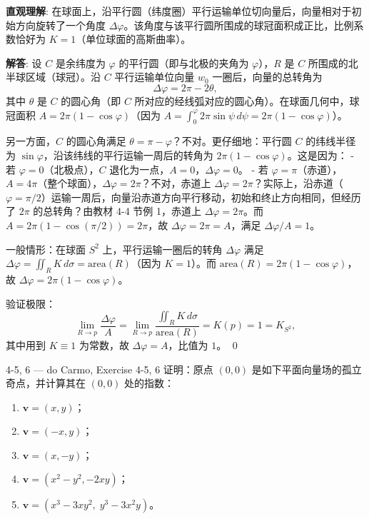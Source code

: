 \begin{solution}
\textbf{直观理解}: 在球面上，沿平行圆（纬度圈）平行运输单位切向量后，向量相对于初始方向旋转了一个角度 $\Delta\varphi$。该角度与该平行圆所围成的球冠面积成正比，比例系数恰好为 $K=1$（单位球面的高斯曲率）。

\textbf{解答}: 设 $C$ 是余纬度为 $\varphi$ 的平行圆（即与北极的夹角为 $\varphi$），$R$ 是 $C$ 所围成的北半球区域（球冠）。沿 $C$ 平行运输单位向量 $w_0$ 一圈后，向量的总转角为
\[
\Delta\varphi = 2\pi - 2\theta,
\]
其中 $\theta$ 是 $C$ 的圆心角（即 $C$ 所对应的经线弧对应的圆心角）。在球面几何中，球冠面积 $A = 2\pi(1-\cos\varphi)$（因为 $A = \int_0^{\varphi} 2\pi\sin\psi\, d\psi = 2\pi(1-\cos\varphi)$）。

另一方面，$C$ 的圆心角满足 $\theta = \pi - \varphi$？不对。更仔细地：平行圆 $C$ 的纬线半径为 $\sin\varphi$，沿该纬线的平行运输一周后的转角为 $2\pi(1-\cos\varphi)$。这是因为：
- 若 $\varphi = 0$（北极点），$C$ 退化为一点，$A=0$，$\Delta\varphi = 0$。
- 若 $\varphi = \pi$（赤道），$A = 4\pi$（整个球面），$\Delta\varphi = 2\pi$？不对，赤道上 $\Delta\varphi = 2\pi$？实际上，沿赤道（$\varphi = \pi/2$）运输一周后，向量沿赤道方向平行移动，初始和终止方向相同，但经历了 $2\pi$ 的总转角？由教材 4-4 节例 1，赤道上 $\Delta\varphi = 2\pi$。而 $A = 2\pi(1-\cos(\pi/2)) = 2\pi$，故 $\Delta\varphi = 2\pi = A$，满足 $\Delta\varphi/A = 1$。

一般情形：在球面 $S^2$ 上，平行运输一圈后的转角 $\Delta\varphi$ 满足 $\Delta\varphi = \iint_R K\, d\sigma = \mathrm{area}(R)$（因为 $K=1$）。而 $\mathrm{area}(R) = 2\pi(1-\cos\varphi)$，故 $\Delta\varphi = 2\pi(1-\cos\varphi)$。

验证极限：
\[
\lim_{R \to p} \frac{\Delta\varphi}{A} = \lim_{R \to p} \frac{\iint_R K\, d\sigma}{\mathrm{area}(R)} = K(p) = 1 = K_{S^2},
\]
其中用到 $K \equiv 1$ 为常数，故 $\Delta\varphi = A$，比值为 $1$。
\qed
\end{solution}

\begin{exercise}{4-5, 6 — do Carmo, Exercise 4-5, 6}
证明：原点 $(0,0)$ 是如下平面向量场的孤立奇点，并计算其在 $(0,0)$ 处的指数：
\begin{enumerate}
\item[*] $\mathbf{v} = (x,y)$；
\item $\mathbf{v} = (-x,y)$；
\item $\mathbf{v} = (x,-y)$；
\item[*] $\mathbf{v} = (x^2 - y^2, -2xy)$；
\item $\mathbf{v} = (x^3 - 3xy^2,\; y^3 - 3x^2y)$。
\end{enumerate}
\end{exercise}


